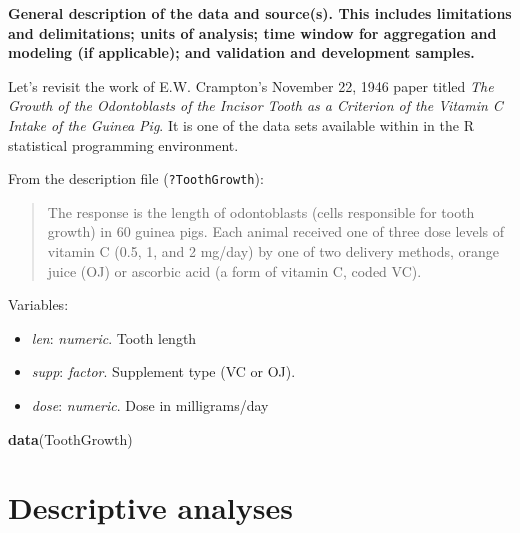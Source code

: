 \documentclass[12pt,oneside]{chicagocapstone}
\newenvironment{Shaded}{\begin{snugshade}}{\end{snugshade}}
\newcommand{\KeywordTok}[1]{\textcolor[rgb]{0.13,0.29,0.53}{\textbf{#1}}}
\newcommand{\NormalTok}[1]{#1}
\providecommand{\tightlist}{%
  \setlength{\itemsep}{0pt}\setlength{\parskip}{0pt}}
\begin{document}
\textbf{General description of the data and source(s). This includes limitations and delimitations; units of analysis; time window for aggregation and modeling (if applicable); and validation and development samples.}

Let's revisit the work of E.W. Crampton's November 22, 1946 paper titled \emph{The Growth of the Odontoblasts of the Incisor Tooth as a Criterion of the Vitamin C Intake of the Guinea Pig}. It is one of the data sets available within in the R statistical programming environment.

From the description file (\texttt{?ToothGrowth}):
\begin{quote}
The response is the length of odontoblasts (cells responsible for tooth growth) in 60 guinea pigs. Each animal received one of three dose levels of vitamin C (0.5, 1, and 2 mg/day) by one of two delivery methods, orange juice (OJ) or ascorbic acid (a form of vitamin C, coded VC).
\end{quote}
Variables:
\begin{itemize}
\tightlist
\item
  \emph{len}: \emph{numeric}. Tooth length
\item
  \emph{supp}: \emph{factor}. Supplement type (VC or OJ).
\item
  \emph{dose}: \emph{numeric}. Dose in milligrams/day
\end{itemize}
\begin{Shaded}
\begin{Highlighting}[]
\KeywordTok{data}\NormalTok{(ToothGrowth)}
\end{Highlighting}
\end{Shaded}
\hypertarget{methodology-descriptive}{%
\section*{Descriptive analyses}\label{methodology-descriptive}}
\end{document}
